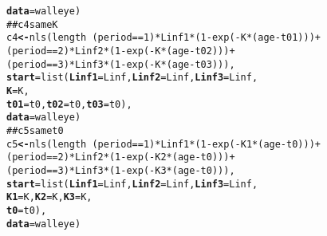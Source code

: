 \documentclass[12pt,oneside,a4paper]{article}\usepackage[]{graphicx}\usepackage[]{xcolor}
\makeatletter
\newcommand{\hlnum}[1]{\textcolor[rgb]{0,0,0}{#1}}%
\newcommand{\hlcom}[1]{\textcolor[rgb]{0.443,0.478,0.702}{#1}}%
\newcommand{\hlopt}[1]{\textcolor[rgb]{0,0,0}{#1}}%
\newcommand{\hlstd}[1]{\textcolor[rgb]{0,0,0}{#1}}%
\newcommand{\hlkwb}[1]{\textcolor[rgb]{0.498,0,0.333}{\textbf{#1}}}%
\newcommand{\hlkwc}[1]{\textcolor[rgb]{0.498,0,0.333}{\textbf{#1}}}%
\newcommand{\hlkwd}[1]{\textcolor[rgb]{0,0,0}{#1}}%
\newenvironment{kframe}{%
 \def\at@end@of@kframe{}%
 \ifinner\ifhmode%
  \def\at@end@of@kframe{\end{minipage}}%
  \begin{minipage}{\columnwidth}%
 \fi\fi%
 \def\FrameCommand##1{\hskip\@totalleftmargin \hskip-\fboxsep
 \colorbox{shadecolor}{##1}\hskip-\fboxsep
     \hskip-\linewidth \hskip-\@totalleftmargin \hskip\columnwidth}%
 \MakeFramed {\advance\hsize-\width
   \@totalleftmargin\z@ \linewidth\hsize
   \@setminipage}}%
 {\par\unskip\endMakeFramed%
 \at@end@of@kframe}
\newenvironment{knitrout}{}{} %
\makeatother
\begin{document}
\begin{knitrout}
\begin{kframe}
\begin{alltt}
          \hlkwc{data} \hlstd{= walleye)}
\hlcom{## c4 same K}
\hlstd{c4} \hlkwb{<-} \hlkwd{nls}\hlstd{(length} \hlopt{~} \hlstd{(period} \hlopt{==} \hlnum{1}\hlstd{)} \hlopt{*} \hlstd{Linf1} \hlopt{*} \hlstd{(}\hlnum{1} \hlopt{-} \hlkwd{exp}\hlstd{(} \hlopt{-} \hlstd{K} \hlopt{*} \hlstd{(age} \hlopt{-} \hlstd{t01)))} \hlopt{+}
                   \hlstd{(period} \hlopt{==} \hlnum{2}\hlstd{)} \hlopt{*} \hlstd{Linf2} \hlopt{*} \hlstd{(}\hlnum{1} \hlopt{-} \hlkwd{exp}\hlstd{(} \hlopt{-} \hlstd{K} \hlopt{*} \hlstd{(age} \hlopt{-} \hlstd{t02)))} \hlopt{+}
                   \hlstd{(period} \hlopt{==} \hlnum{3}\hlstd{)} \hlopt{*} \hlstd{Linf3} \hlopt{*} \hlstd{(}\hlnum{1} \hlopt{-} \hlkwd{exp}\hlstd{(} \hlopt{-} \hlstd{K} \hlopt{*} \hlstd{(age} \hlopt{-} \hlstd{t03))),}
          \hlkwc{start} \hlstd{=} \hlkwd{list}\hlstd{(}\hlkwc{Linf1} \hlstd{= Linf,} \hlkwc{Linf2} \hlstd{= Linf,} \hlkwc{Linf3} \hlstd{= Linf,}
                       \hlkwc{K} \hlstd{= K,}
                       \hlkwc{t01} \hlstd{= t0,} \hlkwc{t02} \hlstd{= t0,} \hlkwc{t03} \hlstd{= t0),}
          \hlkwc{data} \hlstd{= walleye)}
\hlcom{## c5 same t0}
\hlstd{c5} \hlkwb{<-} \hlkwd{nls}\hlstd{(length} \hlopt{~} \hlstd{(period} \hlopt{==} \hlnum{1}\hlstd{)} \hlopt{*} \hlstd{Linf1} \hlopt{*} \hlstd{(}\hlnum{1} \hlopt{-} \hlkwd{exp}\hlstd{(} \hlopt{-} \hlstd{K1} \hlopt{*} \hlstd{(age} \hlopt{-} \hlstd{t0)))} \hlopt{+}
                   \hlstd{(period} \hlopt{==} \hlnum{2}\hlstd{)} \hlopt{*} \hlstd{Linf2} \hlopt{*} \hlstd{(}\hlnum{1} \hlopt{-} \hlkwd{exp}\hlstd{(} \hlopt{-} \hlstd{K2} \hlopt{*} \hlstd{(age} \hlopt{-} \hlstd{t0)))} \hlopt{+}
                   \hlstd{(period} \hlopt{==} \hlnum{3}\hlstd{)} \hlopt{*} \hlstd{Linf3} \hlopt{*} \hlstd{(}\hlnum{1} \hlopt{-} \hlkwd{exp}\hlstd{(} \hlopt{-} \hlstd{K3} \hlopt{*} \hlstd{(age} \hlopt{-} \hlstd{t0))),}
          \hlkwc{start} \hlstd{=} \hlkwd{list}\hlstd{(}\hlkwc{Linf1} \hlstd{= Linf,} \hlkwc{Linf2} \hlstd{= Linf,} \hlkwc{Linf3} \hlstd{= Linf,}
                       \hlkwc{K1} \hlstd{= K,} \hlkwc{K2} \hlstd{= K,} \hlkwc{K3} \hlstd{= K,}
                       \hlkwc{t0} \hlstd{= t0),}
          \hlkwc{data} \hlstd{= walleye)}


\end{alltt}
\end{kframe}
\end{knitrout}
\end{document}
